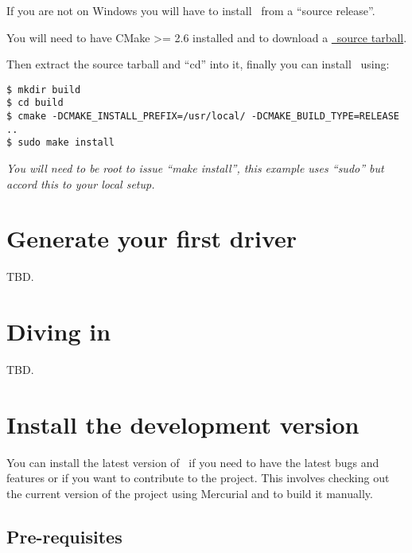 \documentclass[american]{rtxarticle}
\begin{document}
If you are not on Windows you will have to install \rtx\ from a ``source
release''.

You will need to have CMake >= 2.6 installed and to download a
\href{http://rathaxes.googlecode.com/files/rathaxes-src-latest.tar.gz}{\rtx\ source tarball}.

Then extract the source tarball and ``cd'' into it, finally you can install
\rtx\ using:

\begin{lstlisting}
$ mkdir build
$ cd build
$ cmake -DCMAKE_INSTALL_PREFIX=/usr/local/ -DCMAKE_BUILD_TYPE=RELEASE ..
$ sudo make install
\end{lstlisting}

\emph{You will need to be root to issue ``make install'', this example uses
``sudo'' but accord this to your local setup.}

\section{Generate your first driver}

TBD.

\section{Diving in}

TBD.


\section{Install the development version}

You can install the latest version of \rtx\ if you need to have the latest bugs
and features or if you want to contribute to the project. This involves checking
out the current version of the project using Mercurial and to build it manually.

\subsection{Pre-requisites}
\end{document}
